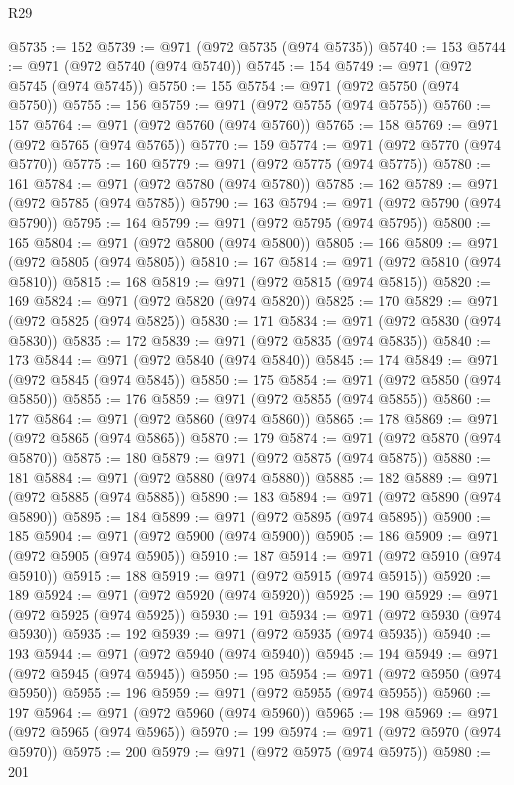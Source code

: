 \begin{lexlean}{R29}
\begin{coremodule}
@5735 := 152
@5739 := @971 (@972 @5735 (@974 @5735))
@5740 := 153
@5744 := @971 (@972 @5740 (@974 @5740))
@5745 := 154
@5749 := @971 (@972 @5745 (@974 @5745))
@5750 := 155
@5754 := @971 (@972 @5750 (@974 @5750))
@5755 := 156
@5759 := @971 (@972 @5755 (@974 @5755))
@5760 := 157
@5764 := @971 (@972 @5760 (@974 @5760))
@5765 := 158
@5769 := @971 (@972 @5765 (@974 @5765))
@5770 := 159
@5774 := @971 (@972 @5770 (@974 @5770))
@5775 := 160
@5779 := @971 (@972 @5775 (@974 @5775))
@5780 := 161
@5784 := @971 (@972 @5780 (@974 @5780))
@5785 := 162
@5789 := @971 (@972 @5785 (@974 @5785))
@5790 := 163
@5794 := @971 (@972 @5790 (@974 @5790))
@5795 := 164
@5799 := @971 (@972 @5795 (@974 @5795))
@5800 := 165
@5804 := @971 (@972 @5800 (@974 @5800))
@5805 := 166
@5809 := @971 (@972 @5805 (@974 @5805))
@5810 := 167
@5814 := @971 (@972 @5810 (@974 @5810))
@5815 := 168
@5819 := @971 (@972 @5815 (@974 @5815))
@5820 := 169
@5824 := @971 (@972 @5820 (@974 @5820))
@5825 := 170
@5829 := @971 (@972 @5825 (@974 @5825))
@5830 := 171
@5834 := @971 (@972 @5830 (@974 @5830))
@5835 := 172
@5839 := @971 (@972 @5835 (@974 @5835))
@5840 := 173
@5844 := @971 (@972 @5840 (@974 @5840))
@5845 := 174
@5849 := @971 (@972 @5845 (@974 @5845))
@5850 := 175
@5854 := @971 (@972 @5850 (@974 @5850))
@5855 := 176
@5859 := @971 (@972 @5855 (@974 @5855))
@5860 := 177
@5864 := @971 (@972 @5860 (@974 @5860))
@5865 := 178
@5869 := @971 (@972 @5865 (@974 @5865))
@5870 := 179
@5874 := @971 (@972 @5870 (@974 @5870))
@5875 := 180
@5879 := @971 (@972 @5875 (@974 @5875))
@5880 := 181
@5884 := @971 (@972 @5880 (@974 @5880))
@5885 := 182
@5889 := @971 (@972 @5885 (@974 @5885))
@5890 := 183
@5894 := @971 (@972 @5890 (@974 @5890))
@5895 := 184
@5899 := @971 (@972 @5895 (@974 @5895))
@5900 := 185
@5904 := @971 (@972 @5900 (@974 @5900))
@5905 := 186
@5909 := @971 (@972 @5905 (@974 @5905))
@5910 := 187
@5914 := @971 (@972 @5910 (@974 @5910))
@5915 := 188
@5919 := @971 (@972 @5915 (@974 @5915))
@5920 := 189
@5924 := @971 (@972 @5920 (@974 @5920))
@5925 := 190
@5929 := @971 (@972 @5925 (@974 @5925))
@5930 := 191
@5934 := @971 (@972 @5930 (@974 @5930))
@5935 := 192
@5939 := @971 (@972 @5935 (@974 @5935))
@5940 := 193
@5944 := @971 (@972 @5940 (@974 @5940))
@5945 := 194
@5949 := @971 (@972 @5945 (@974 @5945))
@5950 := 195
@5954 := @971 (@972 @5950 (@974 @5950))
@5955 := 196
@5959 := @971 (@972 @5955 (@974 @5955))
@5960 := 197
@5964 := @971 (@972 @5960 (@974 @5960))
@5965 := 198
@5969 := @971 (@972 @5965 (@974 @5965))
@5970 := 199
@5974 := @971 (@972 @5970 (@974 @5970))
@5975 := 200
@5979 := @971 (@972 @5975 (@974 @5975))
@5980 := 201

\end{coremodule}
\end{lexlean}
